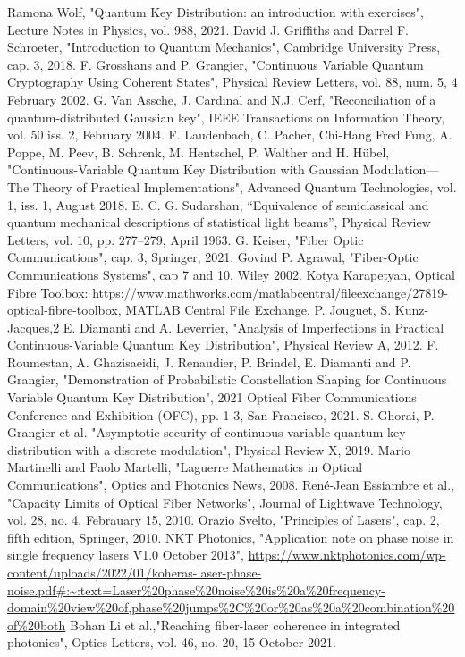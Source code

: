 \documentclass[journal, letterpaper]{IEEEtran}
\begin{document}
\begin{thebibliography}{3}
Ramona Wolf, "Quantum Key Distribution: an introduction with exercises", Lecture Notes in Physics, vol. 988, 2021.
David J. Griffiths and Darrel F. Schroeter, "Introduction to Quantum Mechanics", Cambridge University Press, cap. 3, 2018.
F. Grosshans and P. Grangier, "Continuous Variable Quantum Cryptography Using Coherent States",  Physical Review Letters, vol. 88, num. 5, 4 February 2002.
G. Van Assche, J. Cardinal and N.J. Cerf, "Reconciliation of a quantum-distributed Gaussian key", IEEE Transactions on Information Theory, vol. 50 iss. 2, February 2004.
F. Laudenbach, C. Pacher, Chi-Hang Fred Fung, A. Poppe, M. Peev, B. Schrenk, M. Hentschel, P. Walther and H. Hübel, "Continuous-Variable Quantum Key Distribution
with Gaussian Modulation—The Theory of Practical
Implementations", Advanced Quantum Technologies,
vol. 1, iss. 1, August 2018.
E. C. G. Sudarshan, “Equivalence of semiclassical and quantum mechanical descriptions of statistical light beams”, Physical Review Letters, vol. 10, pp. 277–279, April 1963.
G. Keiser, "Fiber Optic Communications", cap. 3, Springer, 2021.
Govind P. Agrawal, "Fiber-Optic Communications Systems", cap 7 and 10, Wiley 2002.
Kotya Karapetyan, Optical Fibre Toolbox: \url{https://www.mathworks.com/matlabcentral/fileexchange/27819-optical-fibre-toolbox}, MATLAB Central File Exchange.
P. Jouguet, S. Kunz-Jacques,2 E. Diamanti and A. Leverrier, "Analysis of Imperfections in Practical Continuous-Variable Quantum Key Distribution", Physical Review A, 2012.
F. Roumestan, A. Ghazisaeidi, J. Renaudier, P. Brindel, E. Diamanti and P. Grangier, "Demonstration of Probabilistic Constellation Shaping for Continuous Variable Quantum Key Distribution", 2021 Optical Fiber Communications Conference and Exhibition (OFC), pp. 1-3, San Francisco, 2021.
S. Ghorai, P. Grangier et al. "Asymptotic security of continuous-variable quantum key distribution with a discrete modulation", Physical Review X, 2019.
Mario Martinelli and Paolo Martelli, "Laguerre Mathematics in Optical Communications", Optics and Photonics News, 2008. 
René-Jean Essiambre et al., "Capacity Limits of Optical Fiber Networks", Journal of Lightwave Technology, vol. 28, no. 4, Febrauary 15, 2010. 
Orazio Svelto, "Principles of Lasers", cap. 2, fifth edition, Springer, 2010.
NKT Photonics, "Application note on phase noise in single frequency lasers V1.0 October 2013", \url{https://www.nktphotonics.com/wp-content/uploads/2022/01/koheras-laser-phase-noise.pdf#:~:text=Laser%20phase%20noise%20is%20a%20frequency-domain%20view%20of,phase%20jumps%2C%20or%20as%20a%20combination%20of%20both}
Bohan Li et al.,"Reaching fiber-laser coherence in integrated photonics", Optics Letters, vol. 46, no. 20, 15 October 2021.


\end{thebibliography}
\end{document}
